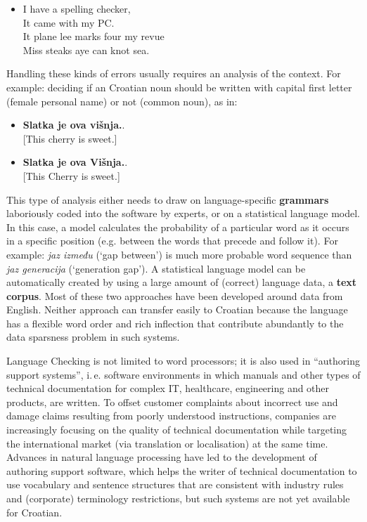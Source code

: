 \begin{multicols}{2}
\begin{itemize}
\item[] I have a spelling checker,\\
  It came with my PC.\\
  It plane lee marks four my revue\\
  Miss steaks aye can knot sea.
\end{itemize}

Handling these kinds of errors usually requires an analysis of the context. For example: deciding if an Croatian noun should be written with capital first letter (female personal name) or not (common noun), as in:

\begin{itemize}
\item \textbf{Slatka je ova višnja.}.\\
  {[}This cherry is sweet.{]} 
\item \textbf{Slatka je ova Višnja.}.\\
  {[}This Cherry is sweet.{]}
\end{itemize}

This type of analysis either needs to draw on language-specific \textbf{grammars} laboriously coded into the software by experts, or on a statistical language model. In this case, a model calculates the probability of a particular word as it occurs in a specific position (e.g. between the words that precede and follow it). For example: \emph{jaz između} (‘gap between’) is much more probable word sequence than \emph{jaz generacija} (‘generation gap’). A statistical language model can be automatically created by using a large amount of (correct) language data, a \textbf{text corpus}. Most of these two approaches have been developed around data from English. Neither approach can transfer easily to Croatian because the language has a flexible word order and rich inflection that contribute abundantly to the data sparsness problem in such systems.

Language Checking is not limited to word processors; it is also used in “authoring support systems”, i.\,e. software environments in which manuals and other types of technical documentation for complex IT, healthcare, engineering and other products, are written. To offset customer complaints about incorrect use and damage claims resulting from poorly understood instructions, companies are increasingly focusing on the quality of technical documentation while targeting the international market (via translation or localisation) at the same time. Advances in natural language processing have led to the development of authoring support software, which helps the writer of technical documentation to use vocabulary and sentence structures that are consistent with industry rules and (corporate) terminology restrictions, but such systems are not yet available for Croatian.


\end{multicols}
